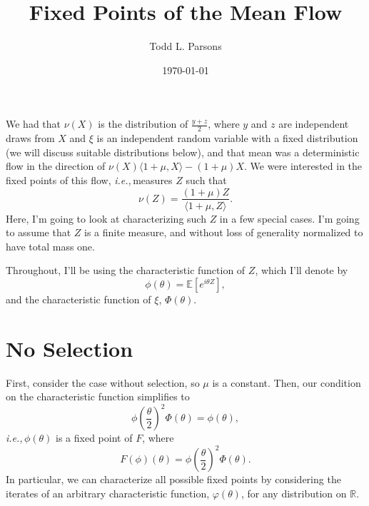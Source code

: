 \documentclass[11pt]{amsart}
\theoremstyle{remark}
\theoremstyle{definition}
\newcommand{\ie}{\textit{i.e.,}\,}
\begin{document}
\title{Fixed Points of the Mean Flow}
\author{Todd L. Parsons}
\address{Laboratoire de Probabilit\'es, Statistique et Mod\'elisation, UMR8001, Sorbonne Universit\'e, Paris, 75005, France.}


\date{\today}



\maketitle

We had that $\nu(X)$ is the distribution of $\frac{y+z}{2}$, where $y$ and $z$ are independent draws from $X$ and $\xi$ is an independent  random variable with a fixed distribution (we will discuss suitable distributions below), and that mean was a deterministic flow in the direction of $\nu(X) \langle 1+ \mu, X \rangle - (1+\mu) X$.  We were interested in the fixed points of this flow, \ie measures $Z$ such that 
\[
	\nu(Z) = \frac{(1+\mu) Z}{\langle 1+ \mu, Z \rangle}.
\]
Here, I'm going to look at characterizing such $Z$ in a few special cases.  I'm going to assume that $Z$ is a finite measure, and without loss of generality normalized to have total mass one.

Throughout, I'll be using the characteristic function of $Z$, which I'll denote by 
\[
	\phi(\theta) = \mathbb{E}\left[e^{i\theta Z}\right],
\]
and the characteristic function of $\xi$, $\Phi(\theta)$.

\section{No Selection}

First, consider the case without selection, so $\mu$ is a constant.  Then, our condition on the characteristic function simplifies to
\begin{equation}\label{CHARACTERISTIC}
	{\textstyle \phi\left(\frac{\theta}{2}\right)^{2}} \Phi(\theta) %
	= \phi(\theta),
\end{equation}
\ie $\phi(\theta)$ is a fixed point of $F$, where
 \[
	F(\phi)(\theta) = {\textstyle \phi\left(\frac{\theta}{2}\right)^{2}} \Phi(\theta).
\]
In particular, we can characterize all possible fixed points by considering the iterates of an arbitrary characteristic function, $\varphi(\theta)$, for  any distribution on $\mathbb{R}$.  
\end{document}
